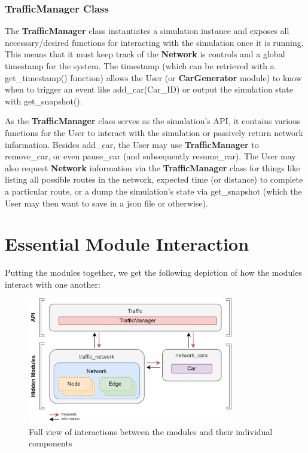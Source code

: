 \subsubsection{TrafficManager Class}

\par The \textbf{TrafficManager} class instantiates a simulation instance and exposes all necessary/desired functions for interacting with the simulation once it is running.  This means that it must keep track of the \textbf{Network} is controls and a global timestamp for the system.  The timestamp (which can be retrieved with a get\_timestamp() function) allows the User (or \textbf{CarGenerator} module) to know when to trigger an event like add\_car(Car\_ID) or output the simulation state with get\_snapshot(). \\

\par As the \textbf{TrafficManager} class serves as the simulation's API, it contains various functions for the User to interact with the simulation or passively return network information.  Besides add\_car, the User may use \textbf{TrafficManager} to remove\_car, or even pause\_car (and subsequently resume\_car).  The User may also request \textbf{Network} information via the \textbf{TrafficManager} class for things like listing all possible routes in the network, expected time (or distance) to complete a particular route, or a dump the simulation's state via get\_snapshot (which the User may then want to save in a json file or otherwise).


\section{Essential Module Interaction}

\par Putting the modules together, we get the following depiction of how the modules interact with one another:

\begin{figure}[H]
    \centering
	\includegraphics[width=0.8\textwidth]{tex files/Figures/Revised_Interaction_Arch.png}
	\caption[Software Interaction:  Full View]{Full view of interactions between the modules and their individual components}
	\label{fig:interactions_detailed}
\end{figure}

